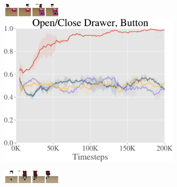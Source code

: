 \begin{figure}[t]
\begin{subfigure}[b]{0.21\textwidth}
    \end{subfigure}
    \begin{subfigure}[b]{0.21\textwidth}
        \center
        \includegraphics[width=3cm]{val/imgs/comparison_data/filmstrip_bottom.jpeg}
        
        \vspace{0.1cm}
        \includegraphics[width=1\textwidth]{val/imgs/comparison_data_new/plt2-crop.pdf}
    \end{subfigure}
    \begin{subfigure}[b]{0.21\textwidth}
        \center
        \includegraphics[width=3cm]{val/imgs/comparison_data/filmstrip_b.jpeg}
        

\end{subfigure}
\end{figure}
